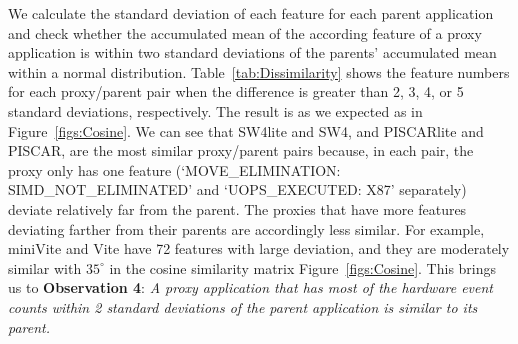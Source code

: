 We calculate the standard deviation of each feature for each parent application and check whether the accumulated mean of the according feature of a proxy application is within two standard deviations of the parents' accumulated mean within a normal distribution. 
Table~\ref{tab:Dissimilarity} shows the feature numbers for each proxy/parent pair when the difference is greater than 2, 3, 4, or 5 standard deviations, respectively. The result is as we expected as in Figure~\ref{figs:Cosine}. We can see that SW4lite and SW4, and PISCARlite and PISCAR, are the most similar proxy/parent pairs because, in each pair, the proxy only has one feature (`MOVE\_ELIMINATION: SIMD\_NOT\_ELIMINATED' and `UOPS\_EXECUTED: X87' separately) deviate relatively far from the parent. The proxies that have more features deviating farther from their parents are accordingly less similar. For example, miniVite and Vite have 72 features with large deviation, and they are moderately similar with $35^\circ$ in the cosine similarity matrix Figure~\ref{figs:Cosine}. This 
brings us to \textbf{Observation 4}: \textit{A proxy application that has most of the hardware event counts within 2 standard deviations of the parent application is similar to its parent.} 



